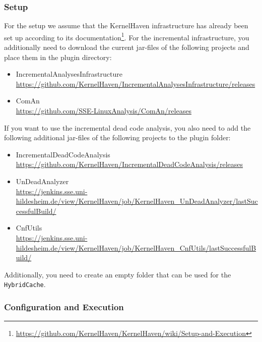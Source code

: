 \documentclass[a4paper]{article}
\begin{document}
\subsubsection{Setup}

For the setup we assume that the KernelHaven infrastructure has already been set up according to its documentation\footnote{\url{https://github.com/KernelHaven/KernelHaven/wiki/Setup-and-Execution}}.
For the incremental infrastructure, you additionally need to download the current jar-files of the following projects and place them in the plugin directory:

\begin{sloppypar}
\begin{itemize}
	\item IncrementalAnalysesInfrastructure \\ \url{https://github.com/KernelHaven/IncrementalAnalysesInfrastructure/releases}
	\item ComAn \\ \url{https://github.com/SSE-LinuxAnalysis/ComAn/releases}
\end{itemize}
\end{sloppypar}

If you want to use the incremental dead code analysis, you also need to add the following additional jar-files of the following projects to the plugin folder:
\begin{sloppypar}
\begin{itemize}
	\item IncrementalDeadCodeAnalysis \\ \url{https://github.com/KernelHaven/IncrementalDeadCodeAnalysis/releases}
	\item UnDeadAnalyzer \\ \url{https://jenkins.sse.uni-hildesheim.de/view/KernelHaven/job/KernelHaven_UnDeadAnalyzer/lastSuccessfulBuild/}
	\item CnfUtils \\ \url{https://jenkins.sse.uni-hildesheim.de/view/KernelHaven/job/KernelHaven_CnfUtils/lastSuccessfulBuild/}
\end{itemize}
	
\end{sloppypar}

Additionally, you need to create an empty folder that can be used for the \texttt{HybridCache}. 

\clearpage
\subsubsection{Configuration and Execution}
\end{document}
